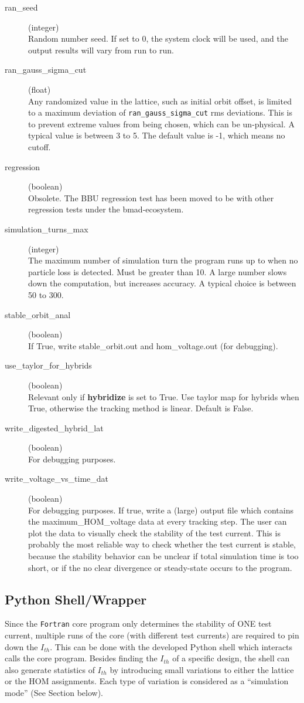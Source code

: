 \documentclass{hitec}
\newcommand{\Newline}{\hfil \\}
\begin{document}
\begin{description}
\item[ran_seed] (integer) \Newline
Random number seed. If set to 0, the system clock will be used, and the output results will vary from run to run.
%
\item[ran_gauss_sigma_cut] (float) \Newline
Any randomized value in the lattice, such as initial orbit offset, is limited to a maximum deviation of \texttt{ran_gauss_sigma_cut} rms deviations. This is to prevent extreme values from being chosen, which can be un-physical. A typical value is between 3 to 5. The default value is -1, which means no cutoff.
%
\item[regression] (boolean) \Newline
Obsolete. The BBU regression test has been moved to be with other regression tests under the bmad-ecosystem. 

\item[simulation_turns_max] (integer) \Newline
The maximum number of simulation turn the program runs up to when no particle loss is detected. Must be greater than 10. A large number slows down the computation, but increases accuracy. A typical choice is between 50 to 300. 
%
\item[stable_orbit_anal] (boolean)\Newline
If True, write stable_orbit.out and hom_voltage.out (for debugging).
%
\item[use_taylor_for_hybrids] (boolean) \Newline
Relevant only if \textbf{hybridize} is set to True. Use taylor map for hybrids when True, otherwise the tracking method is linear. Default is False.
%
\item[write_digested_hybrid_lat] (boolean) \Newline
For debugging purposes.
\item[write_voltage_vs_time_dat] (boolean) \Newline
For debugging purposes. If true, write a (large) output file which contains the maximum_HOM_voltage data at every tracking step. The user can plot the data to visually check the stability of the test current. This is probably the most reliable way to check whether the test current is stable, because the stability behavior can be unclear if total simulation time is too short, or if the no clear divergence or steady-state occurs to the program.

\end{description}

\subsection{Python Shell/Wrapper}
Since the \texttt{Fortran} core program only determines the stability of ONE test current, multiple runs of the core (with different test currents) are required to pin down the $I_{th}$. This can be done with the developed Python shell which interacts calls the core program. Besides finding the $I_{th}$ of a specific design, the shell can also generate statistics of $I_{th}$ by introducing small variations to either the lattice or the HOM assignments. Each type of variation is considered as a ``simulation mode'' (See Section below). 
\end{document}
